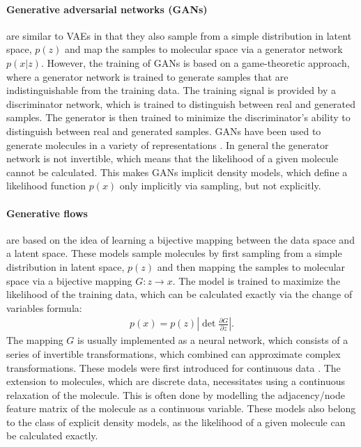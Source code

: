 \paragraph{Generative adversarial networks (GANs)} are similar to VAEs in that
they also sample from a simple distribution in latent space, $p(z)$ and map the samples to 
molecular space via a generator network $p(x|z)$.
However, the training of GANs is based on a game-theoretic approach, where a
generator network is trained to generate samples that are indistinguishable from
the training data. The training signal is provided by a discriminator network,
which is trained to distinguish between real and generated samples. The generator
is then trained to minimize the discriminator's ability to distinguish between
real and generated samples. GANs have been used to generate molecules 
in a variety of representations \citep{todo}. In general the generator network
is not invertible, which means that the likelihood of a given molecule cannot
be calculated. This makes GANs implicit density models, which define a 
likelihood function $p(x)$ only implicitly via sampling, but not explicitly.

\paragraph{Generative flows} are based on the idea of learning a bijective
mapping between the data space and a latent space. These 
models sample molecules by first sampling from a simple distribution in latent
space, $p(z)$ and then mapping the samples to molecular space via a
bijective mapping $G: z \rightarrow x$. The model is trained to maximize the
likelihood of the training data, which can be calculated exactly via 
the change of variables formula:
\begin{align}
    p(x) = p(z) \left| \det \frac{\partial G}{\partial z} \right|.
\end{align}
The mapping $G$ is usually implemented as a neural network, which consists
of a series of invertible transformations, which combined can approximate 
complex transformations. These models were first introduced for continuous data
\citet{rezendeVariationalInferenceNormalizing2016}. The extension to molecules,
which are discrete data, necessitates using a continuous relaxation of the
molecule. This is often done by modelling the adjacency/node feature matrix of
the molecule as a continuous variable. These models also belong to the class of
explicit density models, as the likelihood of a given molecule can be calculated
exactly.

